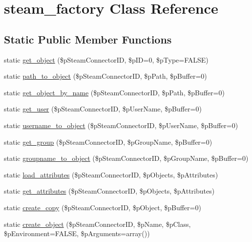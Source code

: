 \hypertarget{classsteam__factory}{
\section{steam\_\-factory Class Reference}
\label{classsteam__factory}
}
\subsection*{Static Public Member Functions}
\begin{DoxyCompactItemize}
\item 
static \hyperlink{classsteam__factory_a43bb6293c515140481c39348305a029b}{get\_\-object} (\$pSteamConnectorID, \$pID=0, \$pType=FALSE)
\item 
static \hyperlink{classsteam__factory_af53f8c36f52f93ebf84342b25415eb12}{path\_\-to\_\-object} (\$pSteamConnectorID, \$pPath, \$pBuffer=0)
\item 
static \hyperlink{classsteam__factory_a805cb8f53c9e336f2f22fb8872d7f3b8}{get\_\-object\_\-by\_\-name} (\$pSteamConnectorID, \$pPath, \$pBuffer=0)
\item 
static \hyperlink{classsteam__factory_a13621b06055a02e337e8eab367df519f}{get\_\-user} (\$pSteamConnectorID, \$pUserName, \$pBuffer=0)
\item 
static \hyperlink{classsteam__factory_aeba4b6c2cfd86d67aec12e141a0bf971}{username\_\-to\_\-object} (\$pSteamConnectorID, \$pUserName, \$pBuffer=0)
\item 
static \hyperlink{classsteam__factory_a143a44712a063729f43390be8fc8bb3e}{get\_\-group} (\$pSteamConnectorID, \$pGroupName, \$pBuffer=0)
\item 
static \hyperlink{classsteam__factory_a2a975da2d1a2a157b74d60d91f25c71a}{groupname\_\-to\_\-object} (\$pSteamConnectorID, \$pGroupName, \$pBuffer=0)
\item 
static \hyperlink{classsteam__factory_a0db8e7ae4c0c88ea6d788e39a0d60f61}{load\_\-attributes} (\$pSteamConnectorID, \$pObjects, \$pAttributes)
\item 
static \hyperlink{classsteam__factory_a0faaee5af20a1bfc1de0b943809940f1}{get\_\-attributes} (\$pSteamConnectorID, \$pObjects, \$pAttributes)
\item 
static \hyperlink{classsteam__factory_ae022d02f7823b826e90ef96e5745e094}{create\_\-copy} (\$pSteamConnectorID, \$pObject, \$pBuffer=0)
\item 
static \hyperlink{classsteam__factory_ac0569bb6dd9d624e1446ef3c1801a7ed}{create\_\-object} (\$pSteamConnectorID, \$pName, \$pClass, \$pEnvironment=FALSE, \$pArguments=array())

\end{DoxyCompactItemize}
